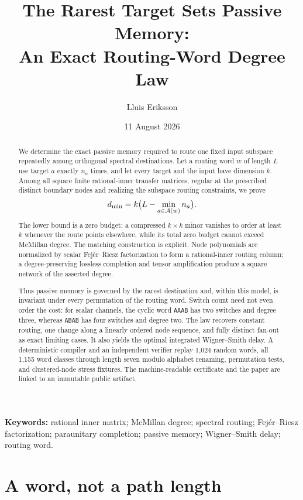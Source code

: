 \documentclass[11pt]{article}
\title{The Rarest Target Sets Passive Memory:\\An Exact Routing-Word Degree Law}
\author{Lluis Eriksson}
\date{11 August 2026}
\theoremstyle{definition}\newtheorem{definition}[theorem]{Definition}\newtheorem{example}[theorem]{Example}
\theoremstyle{remark}\newtheorem{remark}[theorem]{Remark}\newtheorem{limitation}[theorem]{Limitation}
\begin{document}
\maketitle

\begin{abstract}
We determine the exact passive memory required to route one fixed input
subspace repeatedly among orthogonal spectral destinations.  Let a routing
word $w$ of length $L$ use target $a$ exactly $n_a$ times, and let every
target and the input have dimension $k$.  Among all square finite
rational-inner transfer matrices, regular at the prescribed distinct
boundary nodes and realizing the subspace routing constraints, we prove
\[
                  d_{\min}=k\bigl(L-\min_{a\in\mathcal A(w)}n_a\bigr).
\]
The lower bound is a zero budget: a compressed $k\times k$ minor vanishes to
order at least $k$ whenever the route points elsewhere, while its total zero
budget cannot exceed McMillan degree.  The matching construction is
explicit.  Node polynomials are normalized by scalar Fej\'er--Riesz
factorization to form a rational-inner routing column; a degree-preserving
lossless completion and tensor amplification produce a square network of
the asserted degree.

Thus passive memory is governed by the rarest destination and, within this
model, is invariant under every permutation of the routing word.  Switch
count need not even order the cost: for scalar channels, the cyclic word
\texttt{AAAB} has two switches and degree three, whereas \texttt{ABAB} has
four switches and degree two.  The law recovers constant routing, one change
along a linearly ordered node sequence, and fully distinct fan-out as exact
limiting cases.  It also yields
the optimal integrated Wigner--Smith delay.  A deterministic compiler and
an independent verifier replay 1,024 random words, all 1,155 word classes
through length seven modulo alphabet renaming, permutation tests, and
clustered-node stress fixtures.  The machine-readable certificate and the
paper are linked to an immutable public artifact.
\end{abstract}

\noindent\textbf{Keywords:} rational inner matrix; McMillan degree;
spectral routing; Fej\'er--Riesz factorization; paraunitary completion;
passive memory; Wigner--Smith delay; routing word.

\section{A word, not a path length}
\end{document}
